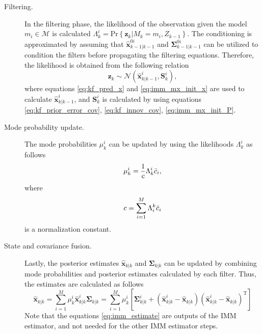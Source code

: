 \documentclass[english, 12pt, a4paper, elec, utf8, a-1b, online]{aaltothesis}
\renewcommand{\vec}[1]{\mathbf{#1}}
\renewcommand{\Pr}[1]{\text{Pr}\left\{ #1 \right\}}
\newcommand{\xpost}{\hat{\vec{x}}_{k|k}}
\newcommand{\postecov}{\boldsymbol{\Sigma}_{k|k}}
\newcommand{\z}{\vec{z}_k}
\newcommand{\normal}[2]{\mathcal{N}\left(#1, #2 \right)}
\newcommand{\transpose}[1]{#1^\text{T}}
\newcommand{\mxnorm}{ \Bar{c}_i }
\newcommand{\xmxinit}{\hat{\vec{x}}^{0i}_{k-1|k-1}}
\newcommand{\ecovmxinit}{\bm{\Sigma}^{0i}_{k-1|k-1}}
\newcommand{\modexprior}{\hat{\vec{x}}^{i}_{k|k-1}}
\newcommand{\modeinnovcov}{\mathbf{S}^i_{k}}
\newcommand{\modexpost}{\hat{\vec{x}}^{i}_{k|k}}
\newcommand{\modecovpost}{\bm{\Sigma}^i_{k|k}}
\newcommand{\modeobsprob}{\Lambda^i_k}
\begin{document}
\begin{description}
\item[Filtering.]

In the filtering phase, the likelihood of the observation given the model $m_i \in \mathcal{M}$ is calculated  $\modeobsprob = \Pr{\z | M_k = m_i, Z_{k-1}} $.
The conditioning is approximated by assuming that $\xmxinit$ and $\ecovmxinit$ can be utilized to condition the filters before propagating the filtering equations.
Therefore, the likelihood is obtained from the following relation
\begin{equation}
    \z \sim \normal{\modexprior}{\modeinnovcov},
\end{equation}
where equations \eqref{eq:kf_pred_x} and \eqref{eq:imm_mx_init_x} are used to calculate $\modexprior$, and $\modeinnovcov$ is calculated by using equations \eqref{eq:kf_prior_error_cov}, \eqref{eq:kf_innov_cov}, \eqref{eq:imm_mx_init_P}.

\item[Mode probability update.]

The mode probabilities $\mu^i_k$ can be updated by using the likelihoods $\Lambda_k^i$ as follows
\begin{equation}
    \mu_k^i = \frac{1}{c} \Lambda^i_k \mxnorm,
\end{equation}
where
\begin{equation}
    c = \sum_{i=1}^M \Lambda_i^k \mxnorm
\end{equation}
is a normalization constant.

\item[State and covariance fusion.]
Lastly, the posterior estimates $\xpost$ and $\postecov$ can be updated by combining mode probabilities and posterior estimates calculated by each filter.
Thus, the estimates are calculated as follows
\begin{subequations}
\label{eq:imm_estimate}
\begin{equation}\label{eq:imm_fusion_x}
    \xpost = \sum_{i=1}^M \mu_k^i \modexpost
\end{equation}
\begin{equation}\label{eq:imm_fusion_P}
    \postecov = \sum_{i=1}^M \mu_k^i 
    \left[ 
        \modecovpost + \left( \modexpost - \xpost \right) \transpose{\left( \modexpost - \xpost \right)}
    \right]
\end{equation}
\end{subequations}
Note that the equations \eqref{eq:imm_estimate} are outputs of the IMM estimator, and not needed for the other IMM estimator steps.
\end{description}
\end{document}
